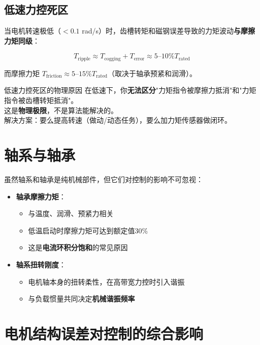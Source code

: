 \subsection{低速力控死区}

当电机转速极低（$<0.1$ rad/s）时，齿槽转矩和磁钢误差导致的力矩波动\textbf{与摩擦力矩同级}：

\begin{equation}
T_{\text{ripple}} \approx T_{\text{cogging}} + T_{\text{error}} \approx 5\text{--}10\% T_{\text{rated}}
\end{equation}

而摩擦力矩 $T_{\text{friction}} \approx 5\text{--}15\% T_{\text{rated}}$（取决于轴承预紧和润滑）。

\begin{keyinsight}{低速力控死区的物理原因}
在低速下，你\textbf{无法区分}"力矩指令被摩擦力抵消"和"力矩指令被齿槽转矩抵消"。\\
这是\textbf{物理极限}，不是算法能解决的。\\
解决方案：要么提高转速（做动/动态任务），要么加力矩传感器做闭环。
\end{keyinsight}

\section{轴系与轴承}

虽然轴系和轴承是纯机械部件，但它们对控制的影响不可忽视：

\begin{itemize}
  \item \textbf{轴承摩擦力矩}：
  \begin{itemize}
    \item 与温度、润滑、预紧力相关
    \item 低温启动时摩擦力矩可达到额定值30\%
    \item 这是\textbf{电流环积分饱和}的常见原因
  \end{itemize}
  \item \textbf{轴系扭转刚度}：
  \begin{itemize}
    \item 电机轴本身的扭转柔性，在高带宽力控时引入谐振
    \item 与负载惯量共同决定\textbf{机械谐振频率}
  \end{itemize}
\end{itemize}

\section{电机结构误差对控制的综合影响}

